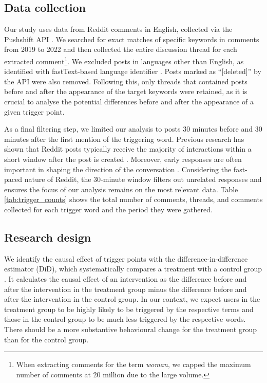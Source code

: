 \subsection{Data collection}
\label{sec:Triggers-data_collection}
Our study uses data from Reddit comments in English, collected via the Pushshift API \cite{baumgartner2020pushshift}. We searched for exact matches of specific keywords in comments from 2019 to 2022 and then collected the entire discussion thread for each extracted comment\footnote{When extracting comments for the term \textit{woman}, we capped the maximum number of comments at 20 million due to the large volume.}. 
We excluded posts in languages other than English, as identified with fastText-based language identifier \cite{bojanowski-etal-2017-enriching}. Posts marked as ``[deleted]'' by the API were also removed. Following this, only threads that contained posts before and after the appearance of the target keywords were retained, as it is crucial to analyse the potential differences before and after the appearance of a given trigger point. %

As a final filtering step, we limited our analysis to posts 30 minutes before and 30 minutes after the first mention of the triggering word. Previous research has shown that Reddit posts typically receive the majority of interactions within a short window after the post is created \cite{thukral2018analyzing}. Moreover, early responses are often important in shaping the direction of the conversation \cite{singer2016evidence,horne2017identifying}. Considering the fast-paced nature of Reddit, the 30-minute window filters out unrelated responses and ensures the focus of our analysis remains on the most relevant data. Table \ref{tab:trigger_counts} shows the total number of comments, threads, and comments collected for each trigger word and the period they were gathered.


\subsection{Research design}
We identify the causal effect of trigger points with the difference-in-difference estimator (DiD), which systematically compares a treatment with a control group \citep{angrist2009mostly, Card1994}. It calculates the causal effect of an intervention as the difference before and after the intervention in the treatment group minus the difference before and after the intervention in the control group. In our context, we expect users in the treatment group to be highly likely to be triggered by the respective terms and those in the control group to be much less triggered by the respective words. There should be a more substantive behavioural change for the treatment group than for the control group. 


